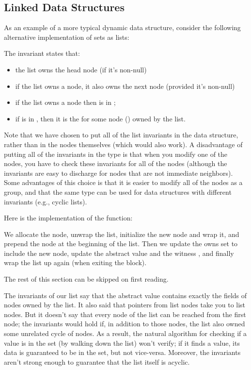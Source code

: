 \subsection{Linked Data Structures}
As an example of a more typical dynamic data structure, consider 
the following alternative implementation of  sets as lists:


\noindent
The invariant states that:
\begin{itemize}
\item the list owns the head node (if it's non-null)
\item if the list owns a node, it also owns the next node (provided it's non-null)
\item if the list owns a node  then  is in ;
\item if  is in , then it is the  for some
  node () owned by the list.
\end{itemize}

Note that we have chosen to put all of the list
invariants in the  data structure, rather than in the nodes
themselves (which would also work). A disadvantage of putting all of
the invariants in the  type is that when you modify one of
the nodes, you have to check these invariants for all of the nodes
(although the invariants are easy to discharge for nodes that are not
immediate neighbors). Some advantages of this choice is that it is
easier to modify all of the nodes as a group, and that the same
 type can be used for data structures with different
invariants (e.g., cyclic lists).

Here is the implementation of the  function:


\noindent
We allocate the node, unwrap the list, initialize the new node and
wrap it, and prepend the node at the beginning of the list.  Then we
update the owns set to include the new node, update the abstract value
 and the witness , and finally wrap the list up
again (when exiting the  block). 

\begin{note}
The rest of this section can be skipped on first reading.
\end{note}

The invariants of our list say that the abstract value contains
exactly the  fields of nodes owned by the list. It also said
that pointers from list nodes take you to list nodes. But it doesn't
say that every node of the list can be reached from the first node;
the invariants would hold if, in addition to those nodes, the list
also owned some unrelated cycle of nodes. As a result, the natural
algorithm for checking if a value is in the set (by walking down the
list) won't verify; if it finds a value, its data is guaranteed to be
in the set, but not vice-versa. Moreover, the invariants aren't strong
enough to guarantee that the list itself is acyclic.

